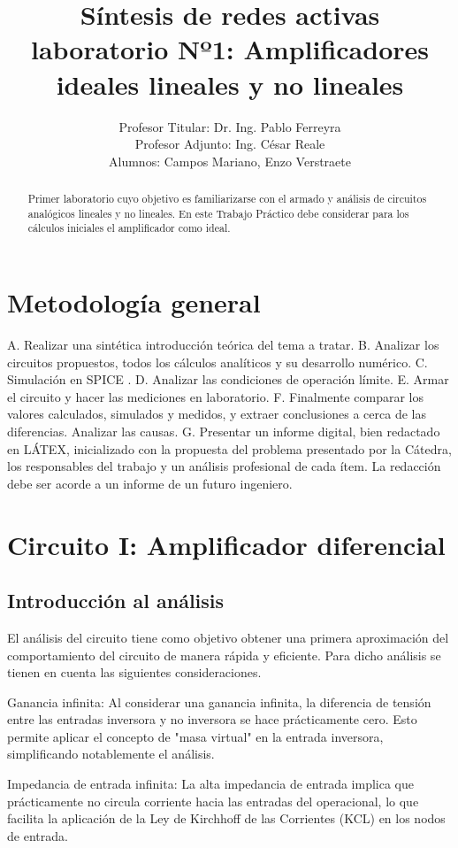 \documentclass[12pt]{article}
\title{Síntesis de redes activas laboratorio Nº1: Amplificadores ideales lineales y no lineales}
\author{Profesor Titular: Dr. Ing. Pablo Ferreyra \\  Profesor Adjunto: Ing. César Reale \\ Alumnos: Campos Mariano, 
		Enzo Verstraete}
\begin{document}
	\maketitle
	
	\begin{abstract}
		Primer laboratorio cuyo objetivo es familiarizarse con el armado y análisis de circuitos analógicos
		lineales y no lineales. En este Trabajo Práctico debe considerar para los cálculos iniciales el
		amplificador como ideal. \newpage
	\end{abstract}
	
	
	\section{Metodología general}	
		A. Realizar una sintética introducción teórica del tema a tratar.
		B. Analizar los circuitos propuestos, todos los cálculos analíticos y su desarrollo numérico.
		C. Simulación en SPICE .
		D. Analizar las condiciones de operación límite.
		E. Armar el circuito y hacer las mediciones en laboratorio.
		F. Finalmente comparar los valores calculados, simulados y medidos, y extraer conclusiones a
		cerca de las diferencias. Analizar las causas.
		G. Presentar un informe digital, bien redactado en LÁTEX, inicializado con la propuesta del
		problema presentado por la Cátedra, los responsables del trabajo y un análisis profesional de
		cada ítem. La redacción debe ser acorde a un informe de un futuro ingeniero.
		
	\section{Circuito I: Amplificador diferencial}
		\subsection{Introducción al análisis}
		
		El análisis del	circuito tiene como objetivo obtener una primera aproximación del comportamiento
		del circuito de manera rápida y eficiente. Para dicho análisis se tienen en cuenta las siguientes
		consideraciones.
		
		Ganancia infinita: Al considerar una ganancia infinita, la diferencia de tensión entre las entradas inversora y no inversora se hace prácticamente cero. Esto permite aplicar el concepto de "masa virtual" en la entrada inversora, simplificando notablemente el análisis.
		
		Impedancia de entrada infinita: La alta impedancia de entrada implica que prácticamente no circula corriente hacia las entradas del operacional, lo que facilita la aplicación de la Ley de Kirchhoff de las Corrientes (KCL) en los nodos de entrada.
		
\end{document}
